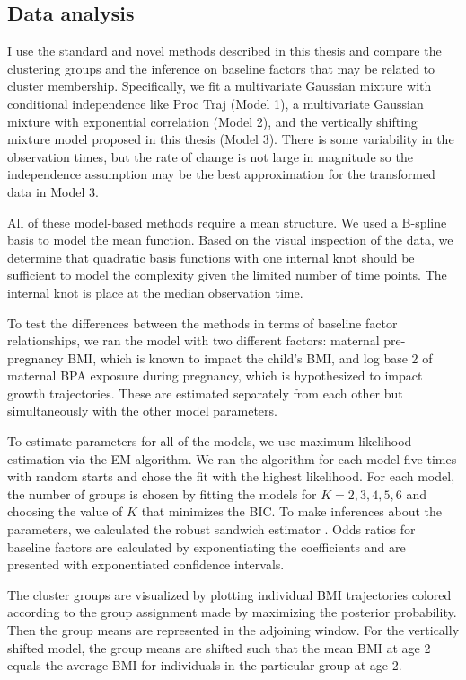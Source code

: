 \subsection{Data analysis}
I use the standard and novel methods described in this thesis and compare the clustering groups and the inference on baseline factors that may be related to cluster membership. Specifically, we fit a multivariate Gaussian mixture with conditional independence like Proc Traj (Model 1), a multivariate Gaussian mixture with exponential correlation (Model 2), and the vertically shifting mixture model proposed in this thesis (Model 3). There is some variability in the observation times, but the rate of change is not large in magnitude so the independence assumption may be the best approximation for the transformed data in Model 3.

All of these model-based methods require a mean structure. We used a B-spline basis to model the mean function. Based on the visual inspection of the data, we determine that quadratic basis functions with one internal knot should be sufficient to model the complexity given the limited number of time points.  The internal knot is place at the median observation time. 

To test the differences between the methods in terms of baseline factor relationships, we ran the model with two different factors: maternal pre-pregnancy BMI, which is known to impact the child's BMI, and log base 2 of maternal BPA exposure during pregnancy, which is hypothesized to impact growth trajectories. These are estimated separately from each other but simultaneously with the other model parameters.

To estimate parameters for all of the models, we use maximum likelihood estimation via the EM algorithm. We ran the algorithm for each model five times with random starts and chose the fit with the highest likelihood. For each model, the number of groups is chosen by fitting the models for $K=2,3,4,5,6$ and choosing the value of $K$ that minimizes the BIC. To make inferences about the parameters, we calculated the robust sandwich estimator \cite{white1982}. Odds ratios for baseline factors are calculated by exponentiating the coefficients and are presented with exponentiated confidence intervals.

The cluster groups are visualized by plotting individual BMI trajectories colored according to the group assignment made by maximizing the posterior probability. Then the group means are represented in the adjoining window. For the vertically shifted model, the group means are shifted such that the mean BMI at age 2 equals the average BMI for individuals in the particular group at age 2. 


